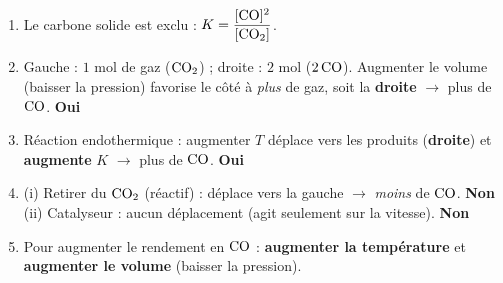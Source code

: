 \documentclass[11pt,a4paper]{article}
\newcommand{\rep}[1]{\textcolor{primarydark}{\textbf{#1}}}
\newcommand{\oui}{\textcolor{excol}{\textbf{Oui}}}
\newcommand{\non}{\textcolor{attncol}{\textbf{Non}}}
\begin{document}
\begin{correction}
\begin{enumerate}[label=\alph*),leftmargin=2em,topsep=2pt,itemsep=2pt]
  \item Le carbone solide est exclu : $K = \dfrac{[\ce{CO}]^2}{[\ce{CO2}]}$.
  \item Gauche : $1$ mol de gaz ($\ce{CO2}$) ; droite : $2$ mol ($2\,\ce{CO}$). Augmenter le volume (baisser
        la pression) favorise le côté à \emph{plus} de gaz, soit la \rep{droite} $\to$ plus de $\ce{CO}$. \oui
  \item Réaction endothermique : augmenter $T$ déplace vers les produits (\rep{droite}) et \rep{augmente} $K$
        $\to$ plus de $\ce{CO}$. \oui
  \item (i) Retirer du $\ce{CO2}$ (réactif) : déplace vers la gauche $\to$ \emph{moins} de $\ce{CO}$. \non \quad
        (ii) Catalyseur : aucun déplacement (agit seulement sur la vitesse). \non
  \item Pour augmenter le rendement en $\ce{CO}$ : \rep{augmenter la température} et \rep{augmenter le volume}
        (baisser la pression).
\end{enumerate}
\end{correction}
\end{document}
